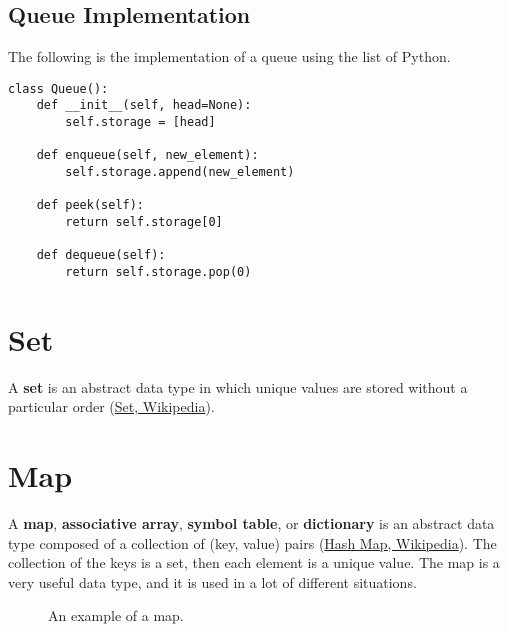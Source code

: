 \subsection{Queue Implementation}
The following is the implementation of a queue using the list of Python.
\begin{lstlisting}[firstnumber=1, caption={Queue implementation.}]
class Queue():
	def __init__(self, head=None):
		self.storage = [head]
	
	def enqueue(self, new_element):
		self.storage.append(new_element)
	
	def peek(self):
		return self.storage[0]
	
	def dequeue(self):
		return self.storage.pop(0)
\end{lstlisting}

\section{Set}
A \textbf{set} is an abstract data type in which unique values are stored without a particular order \cite{wikiset} (\href{https://en.wikipedia.org/wiki/Set_(abstract_data_type)}{Set, Wikipedia}).

\section{Map}
A \textbf{map}, \textbf{associative array}, \textbf{symbol table}, or \textbf{dictionary} is an abstract data type composed of a collection of (key, value) pairs \cite{wikihashmap} (\href{https://en.wikipedia.org/wiki/Associative_array}{Hash Map, Wikipedia}). The collection of the keys is a set, then each element is a unique value. The map is a very useful data type, and it is used in a lot of different situations. 

\begin{figure}[H]
\centering
{}
\caption[An example of a map.]{An example of a map.}
\label{map_1}
\end{figure}

